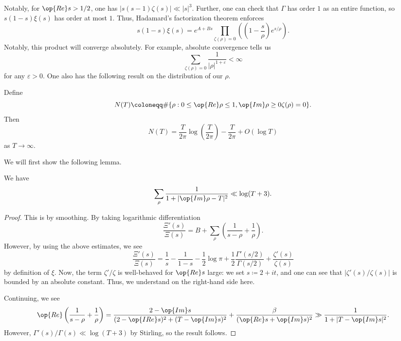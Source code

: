 \documentclass[../notes.tex]{subfiles}
\begin{document}
Notably, for $\op{Re}s>1/2$, one has $|s(s-1)\zeta(s)|\ll|s|^3$. Further, one can check that $\Gamma$ has order $1$ as an entire function, so $s(1-s)\xi(s)$ has order at most $1$. Thus, Hadamard's factorization theorem enforces
\[s(1-s)\xi(s)=e^{A+Bs}\prod_{\zeta(\rho)=0}\left(\left(1-\frac s\rho\right)e^{s/\rho}\right).\]
Notably, this product will converge absolutely. For example, absolute convergence tells us
\[\sum_{\zeta(\rho)=0}\frac1{|\rho|^{1+\varepsilon}}<\infty\]
for any $\varepsilon>0$. One also has the following result on the distribution of our $\rho$.
\begin{theorem} \label{thm:num-zeroes-zeta}
	Define
	\[N(T)\coloneqq\#\{\rho:0\le\op{Re}\rho\le1,\op{Im}\rho\ge0\zeta(\rho)=0\}.\]
	Then
	\[N(T)=\frac T{2\pi}\log\left(\frac T{2\pi}\right)-\frac T{2\pi}+O(\log T)\]
	as $T\to\infty$.
\end{theorem}
We will first show the following lemma.
\begin{lemma} \label{lem:bound-zeroes}
	We have
	\[\sum_\rho\frac1{1+|\op{Im}\rho-T|^2}\ll\log(T+3).\]
\end{lemma}
\begin{proof}
	This is by smoothing. By taking logarithmic differentiation
	\[\frac{\Xi'(s)}{\Xi(s)}=B+\sum_\rho\left(\frac1{s-\rho}+\frac1\rho\right).\]
	However, by using the above estimates, we see
	\[\frac{\Xi'(s)}{\Xi(s)}=\frac1s-\frac1{1-s}-\frac12\log\pi+\frac12\frac{\Gamma'(s/2)}{\Gamma(s/2)}+\frac{\zeta'(s)}{\zeta(s)}\]
	by definition of $\xi$. Now, the term $\zeta'/\zeta$ is well-behaved for $\op{Re}s$ large: we set $s\coloneqq2+it$, and one can see that $|\zeta'(s)/\zeta(s)|$ is bounded by an absolute constant. Thus, we understand on the right-hand side here.

	Continuing, we see
	\[\op{Re}\left(\frac1{s-\rho}+\frac1\rho\right)=\frac{2-\op{Im}s}{(2-\op{IRe}s)^2+(T-\op{Im}s)^2}+\frac\beta{(\op{Re}s+\op{Im}s)^2}\gg\frac1{1+|T-\op{Im}s|^2}.\]
	However, $\Gamma'(s)/\Gamma(s)\ll\log(T+3)$ by Stirling, so the result follows.
\end{proof}
\end{document}
